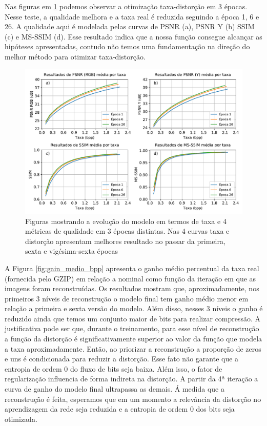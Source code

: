Nas figuras em \ref{fig:metricas_3ep} podemos observar a otimização taxa-distorção em 3 épocas. Nesse teste, a qualidade melhora e a taxa real é reduzida seguindo a época 1, 6 e 26. A qualidade aqui é modelada pelas curvas de PSNR (a), PSNR Y (b)  SSIM (c) e  MS-SSIM (d). Esse resultado indica que a nossa função consegue alcançar as hipóteses apresentadas, contudo não temos uma fundamentação na direção do melhor método para otimizar taxa-distorção.  

\begin{figure}
	\centering
	\includegraphics[width=1\textwidth]{figuras/result_3ep.pdf}
	\caption[Curvas de qualidade por taxa em 3 épocas distintas]{Figuras mostrando a evolução do modelo em termos de taxa e 4 métricas de qualidade em 3 épocas distintas. Nas 4 curvas taxa e distorção apresentam melhores resultado no passar da primeira, sexta e vigésima-sexta épocas}  	
	\label{fig:metricas_3ep}
\end{figure}

A Figura \ref{fig:gain_medio_bpp} apresenta o ganho médio percentual da taxa real (fornecida pelo GZIP) em relação a nominal como função da iteração em que as imagens foram reconstruídas. Os resultados mostram que, aproximadamente, nos primeiros 3 níveis de reconstrução o modelo final tem ganho médio menor em relação a primeira e sexta versão do modelo. Além disso, nesses 3 níveis o ganho é reduzido ainda que temos um conjunto maior de bits para realizar compressão.  
A justificativa pode ser que, durante o treinamento, para esse nível de reconstrução a função da distorção é significativamente superior ao valor da função que modela a taxa aproximadamente. Então, ao priorizar a reconstrução a proporção de zeros e uns é condicionada para reduzir a distorção. Esse fato não garante que a entropia de ordem 0 do fluxo de bits seja baixa. Além isso, o fator de regularização influencia de forma indireta na distorção.
A partir da 4ª iteração a curva de ganho do modelo final ultrapassa as demais. Á medida que a reconstrução é feita, esperamos que em um momento a relevância da distorção no aprendizagem da rede seja reduzida e a entropia de ordem 0 dos bits seja otimizada. 



